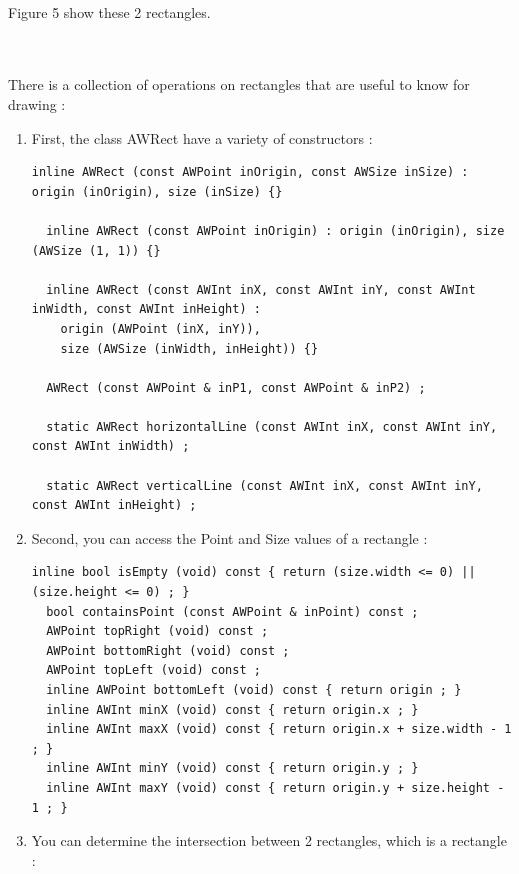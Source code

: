 \documentclass[a4paper,11pt]{extarticle}
\begin{document}
~\\ Figure 5 show these 2 rectangles.

~\\ 

~\\ There is a collection of operations on rectangles that are useful to know for drawing :

\begin{enumerate}
\item First, the class AWRect have a variety of constructors :

\begin{lstlisting}[language=Arduinonl]
  inline AWRect (const AWPoint inOrigin, const AWSize inSize) : origin (inOrigin), size (inSize) {}
  
  inline AWRect (const AWPoint inOrigin) : origin (inOrigin), size (AWSize (1, 1)) {}
  
  inline AWRect (const AWInt inX, const AWInt inY, const AWInt inWidth, const AWInt inHeight) :
  	origin (AWPoint (inX, inY)),
  	size (AWSize (inWidth, inHeight)) {}
	
  AWRect (const AWPoint & inP1, const AWPoint & inP2) ;
  
  static AWRect horizontalLine (const AWInt inX, const AWInt inY, const AWInt inWidth) ;
  
  static AWRect verticalLine (const AWInt inX, const AWInt inY, const AWInt inHeight) ;
\end{lstlisting}

\item Second, you can access the Point and Size values of a rectangle :

\begin{lstlisting}[language=Arduinonl]
  inline bool isEmpty (void) const { return (size.width <= 0) || (size.height <= 0) ; }
  bool containsPoint (const AWPoint & inPoint) const ;
  AWPoint topRight (void) const ;
  AWPoint bottomRight (void) const ;
  AWPoint topLeft (void) const ;
  inline AWPoint bottomLeft (void) const { return origin ; }
  inline AWInt minX (void) const { return origin.x ; }
  inline AWInt maxX (void) const { return origin.x + size.width - 1 ; }
  inline AWInt minY (void) const { return origin.y ; }
  inline AWInt maxY (void) const { return origin.y + size.height - 1 ; }
\end{lstlisting}

\item You can determine the intersection between 2 rectangles, which is a rectangle :


\end{enumerate}
\end{document}
